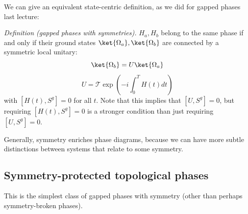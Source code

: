 We can give an equivalent state-centric definition, as we did for gapped phases last lecture:

\textit{Definition (gapped phases with symmetries).} $H_a, H_b$ belong to the same phase if and only if their ground states $\ket{\Omega_a}, \ket{\Omega_b}$ are connected by a symmetric local unitary:
\begin{equation}
    \ket{\Omega_b} = U\ket{\Omega_a}
\end{equation}
\begin{equation}
    U = \mathcal{T}\exp(-i\int_0^T H(t)dt)
\end{equation}
with $[H(t), S^g] = 0$ for all $t$. Note that this implies that $[U, S^g] = 0$, but requiring $[H(t), S^g] = 0$ is a stronger condition than just requiring $[U, S^g] = 0$.

Generally, symmetry enriches phase diagrams, because we can have more subtle distinctions between systems that relate to some symmetry.

\subsection{Symmetry-protected topological phases}
This is the simplest class of gapped phases with symmetry (other than perhaps symmetry-broken phases).

